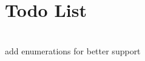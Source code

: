 \chapter{Todo List}
\hypertarget{todo}{}\label{todo}

\begin{DoxyRefList}
\item[Member \doxylink{class_response_a63d0a644a2099e6292ee7112130079fb}{Response\+::send\+File} (const std\+::string \&file\+Path)]\hfill \\
\label{todo__todo000001}%
%
add enumerations for better support 
\end{DoxyRefList}